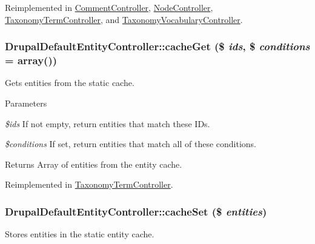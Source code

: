 Reimplemented in \hyperlink{classCommentController_a0feb93a67f87f04b06eb64eb0d359ca7}{CommentController}, \hyperlink{classNodeController_a0326b94bee0719269dfd9f8ef93fbeb1}{NodeController}, \hyperlink{classTaxonomyTermController_a38102da86b43fb5b2c3c3412cb2ba3d2}{TaxonomyTermController}, and \hyperlink{classTaxonomyVocabularyController_a9472e3b979afabb2f1f08fb2cd0f83b8}{TaxonomyVocabularyController}.\hypertarget{classDrupalDefaultEntityController_ae791ed21b33704e3b315d106354959c9}{
\subsubsection[{cacheGet}]{\setlength{\rightskip}{0pt plus 5cm}DrupalDefaultEntityController::cacheGet (\$ {\em ids}, \/  \$ {\em conditions} = {\ttfamily array()})}}
\label{classDrupalDefaultEntityController_ae791ed21b33704e3b315d106354959c9}
Gets entities from the static cache.


\begin{DoxyParams}{Parameters}
\item[{\em \$ids}]If not empty, return entities that match these IDs. \item[{\em \$conditions}]If set, return entities that match all of these conditions.\end{DoxyParams}
\begin{DoxyReturn}{Returns}
Array of entities from the entity cache. 
\end{DoxyReturn}


Reimplemented in \hyperlink{classTaxonomyTermController_a9bfba8c802d79ed1dcdfbfbe915adf1b}{TaxonomyTermController}.\hypertarget{classDrupalDefaultEntityController_a5a63fa946fe3fd17b99f865553d0c74d}{
\subsubsection[{cacheSet}]{\setlength{\rightskip}{0pt plus 5cm}DrupalDefaultEntityController::cacheSet (\$ {\em entities})}}
\label{classDrupalDefaultEntityController_a5a63fa946fe3fd17b99f865553d0c74d}
Stores entities in the static entity cache.


